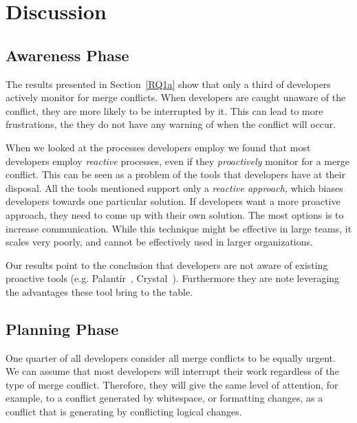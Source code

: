 
\section{Discussion}\label{discussion}

\subsection{Awareness Phase}

The results presented in Section~\ref{RQ1a} show that only a third of developers actively monitor for merge conflicts.
When developers are caught unaware of the conflict, they are more likely to be interrupted by it.
This can lead to more frustrations, the they do not have any warning of when the conflict will occur.

When we looked at the processes developers employ we found that most developers employ \emph{reactive} processes, even if they \emph{proactively} monitor for a merge conflict.
This can be seen as a problem of the tools that developers have at their disposal.
All the tools mentioned support only a \emph{reactive approach,} which biases developers towards one particular solution.
If developers want a more proactive approach, they need to come up with their own solution.
The most options is to increase communication.
While this technique might be effective in large teams, it scales very poorly, and cannot be effectively used in larger organizations. 

Our results point to the conclusion that developers are not aware of existing proactive tools (e.g. Palant\'{i}r~\cite{sarma_palantir:_2003}, Crystal~\cite{Brun2011}).
Furthermore they are note leveraging the advantages these tool bring to the table. %

\subsection{Planning Phase}

One quarter of all developers consider all merge conflicts to be equally urgent.
We can assume that most developers will interrupt their work regardless of the type of merge conflict.
Therefore, they will give the same level of attention, for example, to a conflict generated by whitespace, or formatting changes, as a conflict that is generating by conflicting logical changes. 

